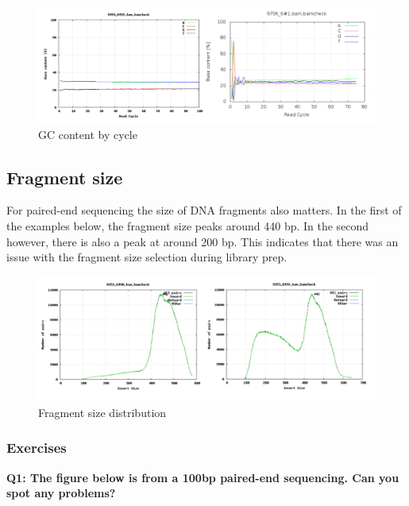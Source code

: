 \documentclass[11pt]{article}
\begin{document}
    \begin{figure}
\centering
\includegraphics{img/acgt_per_cycle_comparison.png}
\caption{GC content by cycle}
\end{figure}

    \hypertarget{fragment-size}{%
\subsection{Fragment size}\label{fragment-size}}

For paired-end sequencing the size of DNA fragments also matters. In the
first of the examples below, the fragment size peaks around 440 bp. In
the second however, there is also a peak at around 200 bp. This
indicates that there was an issue with the fragment size selection
during library prep.

    \begin{figure}
\centering
\includegraphics{img/fragment_size_comparison.png}
\caption{Fragment size distribution}
\end{figure}

    \hypertarget{exercises}{%
\subsubsection{Exercises}\label{exercises}}

\textbf{Q1: The figure below is from a 100bp paired-end sequencing. Can
you spot any problems?}
\end{document}
